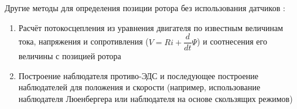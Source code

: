Другие методы для определения позиции ротора без использования датчиков \cite{art:bldc_sensorless}:
\begin{enumerate}
	\item Расчёт потокосцепления из уравнения двигателя по известным величинам тока, напряжения и сопротивления ($V=Ri+\dfrac{d}{dt}\Psi$) и соотнесения его величины с позицией ротора
	\item Построение наблюдателя противо-ЭДС и последующее построение наблюдателей для положения и скорости (например, использование наблюдателя Люенбергера или наблюдателя на основе скользящих режимов)
\end{enumerate}



